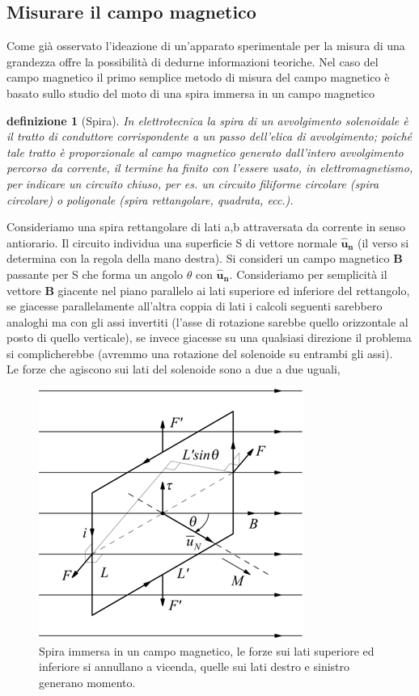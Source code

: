 \documentclass[10pt,a4paper]{article}
\newtheorem{definizione}{definizione}
\begin{document}
\subsection{Misurare il campo magnetico}
Come già osservato l'ideazione di un'apparato sperimentale per la misura di una grandezza offre la possibilità di dedurne informazioni teoriche. Nel caso del campo magnetico il primo semplice metodo di misura del campo magnetico è basato sullo studio del moto di una spira immersa in un campo magnetico
\begin{definizione}[Spira]
	 In elettrotecnica la spira di un avvolgimento solenoidale è il tratto di conduttore corrispondente a un passo dell’elica di avvolgimento; poiché tale tratto è proporzionale al campo magnetico generato dall'intero avvolgimento percorso da corrente, il termine ha finito con l’essere usato, in elettromagnetismo, per indicare un circuito chiuso, per es. un circuito filiforme circolare (spira circolare) o poligonale (spira rettangolare, quadrata, ecc.).
\end{definizione}
Consideriamo una spira rettangolare di lati a,b attraversata da corrente in senso antiorario. Il circuito individua una superficie S di vettore normale $\mathbf{\hat{u}_n}$ (il verso si determina con la regola della mano destra). Si consideri un campo magnetico $\mathbf{B}$ passante per S che forma un angolo $\theta$ con $\mathbf{\hat{u}_n}$. Consideriamo per semplicità il vettore $\mathbf{B}$ giacente nel piano parallelo ai lati superiore ed inferiore del rettangolo, se giacesse parallelamente all'altra coppia di lati i calcoli seguenti sarebbero analoghi ma con gli assi invertiti (l'asse di rotazione sarebbe quello orizzontale al posto di quello verticale), se invece giacesse su una qualsiasi direzione il problema si complicherebbe (avremmo una rotazione del solenoide su entrambi gli assi).\\
Le forze che agiscono sui lati del solenoide sono a due a due uguali,
\begin{figure}[h!]
	\centering
	\includegraphics[width=0.5\linewidth]{images/spira_campo_magnetico}
	\caption{Spira immersa in un campo magnetico, le forze sui lati superiore ed inferiore si annullano a vicenda, quelle sui lati destro e sinistro generano momento.}
	\label{fig:spiracampomagnetico}
\end{figure}
\end{document}
